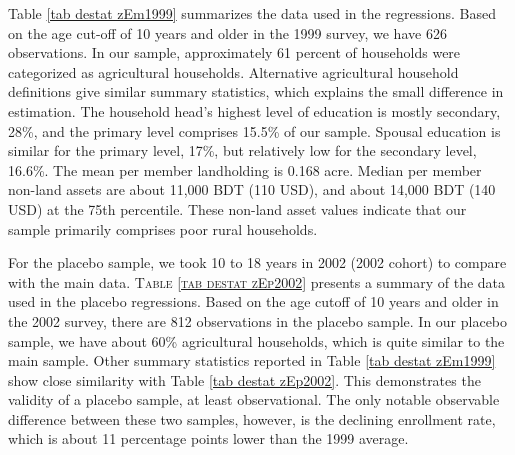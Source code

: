 \documentclass[12pt,letterpaper]{article}
\newcommand{\0}{\ensuremath{\mbox{\boldmath $0$}}}
\begin{document}

Table \ref{tab destat zEm1999} summarizes the data used in the regressions. Based on the age cut-off of 10 years and older in the 1999 survey, we have 626 observations. In our sample, approximately 61 percent of households were categorized as agricultural households. Alternative agricultural household definitions give similar summary statistics, which explains the small difference in estimation. The household head's highest level of education is mostly secondary, 28\%, and the primary level comprises 15.5\% of our sample. Spousal education is similar for the primary level, 17\%, but relatively low for the secondary level, 16.6\%. The mean per member landholding is 0.168 acre. Median per member non-land assets are about 11,000 BDT (110 USD), and about 14,000 BDT (140 USD) at the 75th percentile. These non-land asset values indicate that our sample primarily comprises poor rural households.

For the placebo sample, we took 10 to 18 years in 2002 (2002 cohort) to compare with the main data. \textsc{Table \ref{tab destat zEp2002}} presents a summary of the data used in the placebo regressions. Based on the age cutoff of 10 years and older in the 2002 survey, there are 812 observations in the placebo sample. In our placebo sample, we have about 60\% agricultural households, which is quite similar to the main sample. Other summary statistics reported in Table \ref{tab destat zEm1999} show close similarity with Table \ref{tab destat zEp2002}. This demonstrates the validity of a placebo sample, at least observational. The only notable observable difference between these two samples, however, is the declining enrollment rate, which is about 11 percentage points lower than the 1999 average.
\end{document}
